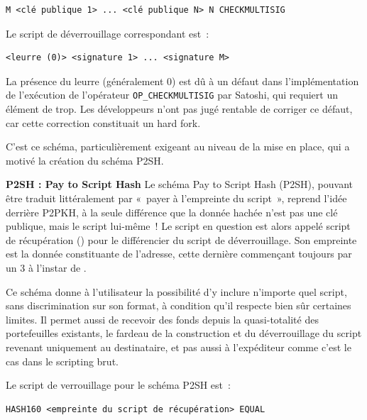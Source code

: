 \begin{Verbatim}[fontsize=\small]
M <clé publique 1> ... <clé publique N> N CHECKMULTISIG
\end{Verbatim}

Le script de déverrouillage correspondant est~:

\begin{Verbatim}[fontsize=\small]
<leurre (0)> <signature 1> ... <signature M>
\end{Verbatim}

La présence du leurre (généralement 0) est dû à un défaut dans l'implémentation de l'exécution de l'opérateur \texttt{OP\_CHECKMULTISIG} par Satoshi, qui requiert un élément de trop. Les développeurs n'ont pas jugé rentable de corriger ce défaut, car cette correction constituait un hard fork.

C'est ce schéma, particulièrement exigeant au niveau de la mise en place, qui a motivé la création du schéma P2SH.

\textbf{P2SH : Pay to Script Hash} Le schéma Pay to Script Hash (P2SH), pouvant être traduit littéralement par «~payer à l'empreinte du script~», reprend l'idée derrière P2PKH, à la seule différence que la donnée hachée n'est pas une clé publique, mais le script lui-même~! Le script en question est alors appelé script de récupération () pour le différencier du script de déverrouillage. Son empreinte est la donnée constituante de l'adresse, cette dernière commençant toujours par un 3 à l'instar de .


Ce schéma donne à l'utilisateur la possibilité d'y inclure n'importe quel script, sans discrimination sur son format, à condition qu'il respecte bien sûr certaines limites. Il permet aussi de recevoir des fonds depuis la quasi-totalité des portefeuilles existants, le fardeau de la construction et du déverrouillage du script revenant uniquement au destinataire, et pas aussi à l'expéditeur comme c'est le cas dans le scripting brut.

Le script de verrouillage pour le schéma P2SH est~:

\begin{Verbatim}[fontsize=\small]
HASH160 <empreinte du script de récupération> EQUAL
\end{Verbatim}

